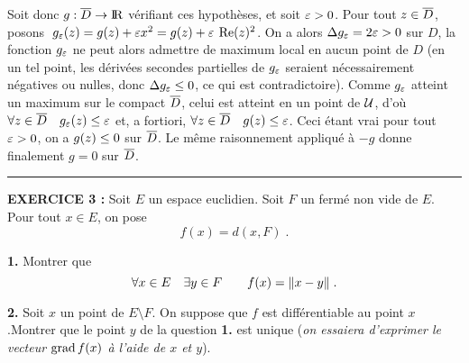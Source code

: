 \documentclass{article}
\begin{document}
Soit donc $g:\overline{D}\rightarrow{\rm I\kern-0.6mm R}$ v\'erifiant ces hypoth\`eses, et soit $\varepsilon>0$. Pour tout $z\in\overline{D}$, posons $\;g_{\varepsilon}(z)=g(z)+\varepsilon x^2=g(z)+\varepsilon\>\mathop{\rm Re}\nolimits(z)^2$. On a alors $\Delta g_{\varepsilon}=2\varepsilon>0$ sur $D$, la fonction $g_{\varepsilon}$ ne peut alors admettre de maximum local en aucun point de $D$ (en un tel point, les d\'eriv\'ees secondes partielles de $g_{\varepsilon}$ seraient n\'ecessairement n\'egatives ou nulles, donc $\Delta g_{\varepsilon}\leq0$, ce qui est contradictoire). Comme $g_{\varepsilon}$ atteint un maximum sur le compact $\overline{D}$, celui est atteint en un point de ${\cal U}$, d'o\`u $\forall z\in\overline{D}\quad g_{\varepsilon}(z)\leq\varepsilon$ et, a fortiori, $\forall z\in\overline{D}\quad g(z)\leq\varepsilon$. Ceci \'etant vrai pour tout $\varepsilon>0$, on a $g(z)\leq0$ sur $\overline{D}$. Le m\^eme raisonnement appliqu\'e \`a $-g$ donne finalement $g=0$ sur $\overline{D}$.

\bsk
\hrule
\bsk

{\bf EXERCICE 3 :}\msk
Soit $E$ un espace euclidien. Soit $F$ un ferm\'e non vide de $E$. Pour tout $x\in E$, on pose\vvv
$$f(x)=d(x,F)\;.$$\par
{\bf 1.} Montrer que\vv
$$\forall x\in E\quad\exists y\in F\qquad f(x)=\|x-y\|\;.$$\par
{\bf 2.} Soit $x$ un point de $E\setminus F$. On suppose que $f$ est diff\'erentiable au point $x$.\ssk\sect Montrer que le point $y$ de la question {\bf 1.} est unique ({\it on essaiera d'exprimer le vecteur $\mathop{\rm grad}\nolimits f(x)$ \`a l'aide de $x$ et $y$}).

\msk
\cl{- - - - - - - - - - - - - - - - - - - - - - - - - - - - - - - }
\msk
\end{document}
